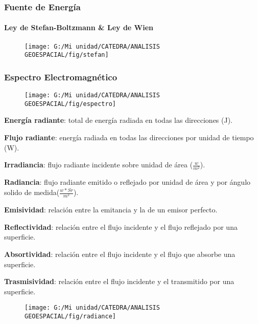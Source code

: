 \documentclass[14pt]{beamer}
\begin{document}
\begin{frame}
\frametitle{Fuente de Energía}
\framesubtitle{Ley de Stefan-Boltzmann \& Ley de Wien}
  \begin{figure}
    \centering
    \texttt{[image: G:/Mi unidad/CATEDRA/ANALISIS GEOESPACIAL/fig/stefan]}
  \end{figure}
\end{frame}
\begin{frame}
\frametitle{Espectro Electromagnético}
  \begin{figure}
    \centering
    \texttt{[image: G:/Mi unidad/CATEDRA/ANALISIS GEOESPACIAL/fig/espectro]}
  \end{figure}
\end{frame}
\begin{frame}
\begin{itemize}
\scriptsize{
\item \textbf{Energía radiante}: total de energía radiada en todas las direcciones (J).
\item \textbf{Flujo radiante}: energía radiada en todas las direcciones por unidad de tiempo (W).
\item \textbf{Irradiancia}: flujo radiante incidente sobre unidad de área ($\frac{w}{m^2}$).
\item \textbf{Radiancia}: flujo radiante emitido o reflejado por unidad de área y por ángulo solido de medida($\frac{w*Sr}{m^2}$).
\item \textbf{Emisividad}: relación entre la emitancia y la de un emisor perfecto.
\item \textbf{Reflectividad}: relación entre el flujo incidente y el flujo reflejado por una superficie.
\item \textbf{Absortividad}: relación entre el flujo incidente y el flujo que absorbe una superficie.
\item \textbf{Trasmisividad}: relación entre el flujo incidente y el transmitido por una superficie.
}
 \begin{figure}
    \centering
    \texttt{[image: G:/Mi unidad/CATEDRA/ANALISIS GEOESPACIAL/fig/radiance]}
  \end{figure}
\end{itemize}
\end{frame}
\end{document}
